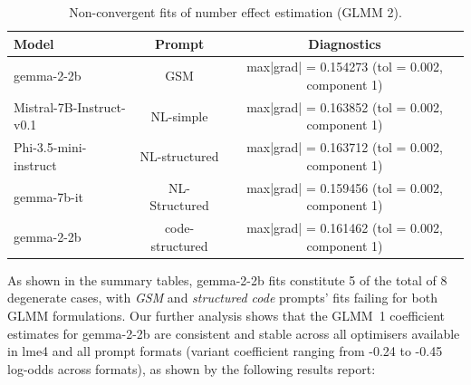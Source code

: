 \documentclass[11pt]{article}
\begin{document}
\begin{table}[H]
\centering
\small
\begin{tabular}{lcc}
\toprule
Model & Prompt & Diagnostics \\
\midrule
gemma-2-2b & GSM & max|grad| = 0.154273 (tol = 0.002, component 1) \\
Mistral-7B-Instruct-v0.1 & NL-simple & max|grad| = 0.163852 (tol = 0.002, component 1) \\
Phi-3.5-mini-instruct & NL-structured & max|grad| = 0.163712 (tol = 0.002, component 1) \\
gemma-7b-it & NL-Structured & max|grad| = 0.159456 (tol = 0.002, component 1) \\
gemma-2-2b & code-structured & max|grad| = 0.161462 (tol = 0.002, component 1) \\
\bottomrule
\end{tabular}
\caption{Non-convergent fits of number effect estimation (GLMM 2).}
\label{tab:nonconvergent-glmm2}
\end{table}

As shown in the summary tables, gemma-2-2b fits constitute 5 of the total of 8 degenerate cases, with \textit{GSM} and \textit{structured code} prompts' fits failing for both GLMM formulations. Our further analysis shows that the GLMM~1 coefficient estimates for gemma-2-2b are consistent and stable across all optimisers available in lme4 and all prompt formats (variant coefficient ranging from -0.24 to -0.45 log-odds across formats), as shown by the following results report:
\end{document}
